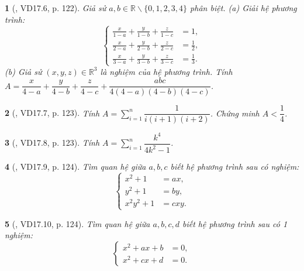 \documentclass{article}
\newtheorem{baitoan}{}
\begin{document}
\begin{baitoan}[\cite{TLCT_THCS_Toan_9_dai_so}, VD17.6, p. 122]
	Giả sử $a,b\in\mathbb{R}\backslash\{0,1,2,3,4\}$ phân biệt. (a) Giải hệ phương trình:
	\begin{equation*}
		\left\{\begin{split}
			\frac{x}{1 - a} + \frac{y}{1 - b} + \frac{z}{1 - c} &= 1,\\
			\frac{x}{2 - a} + \frac{y}{2 - b} + \frac{z}{2 - c} &= \frac{1}{2},\\
			\frac{x}{3 - a} + \frac{y}{3 - b} + \frac{z}{3 - c} &= \frac{1}{3}.
		\end{split}\right.
	\end{equation*}
	(b) Giả sử $(x,y,z)\in\mathbb{R}^3$ là nghiệm của hệ phương trình. Tính $A = \dfrac{x}{4 - a} + \dfrac{y}{4 - b} + \dfrac{z}{4 - c} + \dfrac{abc}{4(4 - a)(4 - b)(4 - c)}$.
\end{baitoan}

\begin{baitoan}[\cite{TLCT_THCS_Toan_9_dai_so}, VD17.7, p. 123]
	Tính $A = \sum_{i=1}^n \dfrac{1}{i(i + 1)(i + 2)}$. Chứng minh $A < \dfrac{1}{4}$.
\end{baitoan}

\begin{baitoan}[\cite{TLCT_THCS_Toan_9_dai_so}, VD17.8, p. 123]
	Tính $A = \sum_{i=1}^n \dfrac{k^4}{4k^2 - 1}$.
\end{baitoan}

\begin{baitoan}[\cite{TLCT_THCS_Toan_9_dai_so}, VD17.9, p. 124]
	Tìm quan hệ giữa $a,b,c$ biết hệ phương trình sau có nghiệm:
	\begin{equation*}
		\left\{\begin{split}
			x^2 + 1 &= ax,\\
			y^2 + 1 &= by,\\
			x^2y^2 + 1 &= cxy.
		\end{split}\right.
	\end{equation*}
\end{baitoan}

\begin{baitoan}[\cite{TLCT_THCS_Toan_9_dai_so}, VD17.10, p. 124]
	Tìm quan hệ giữa $a,b,c,d$ biết hệ phương trình sau có 1 nghiệm:
	\begin{equation*}
		\left\{\begin{split}
			x^2 + ax + b &= 0,\\
			x^2 + cx + d &= 0.
		\end{split}\right.
	\end{equation*}
\end{baitoan}
\end{document}

